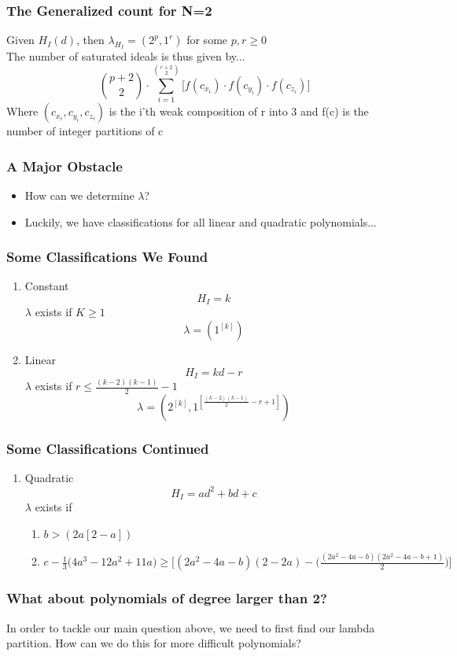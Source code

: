 \documentclass{beamer}
\begin{document}
\begin{frame}
	\frametitle{The Generalized count for N=2}
	Given $H_I(d)$, then $\lambda_{H_I} = (2^{p}, 1^{r})$ for some $p,r \geq 0$\\
	The number of saturated ideals is thus given by...
	\[\binom{p+2}{2}\cdot \sum_{i=1}^{\binom{r+2}{2}}\Big[f(c_{x_i})\cdot f(c_{y_i})\cdot f(c_{z_i})\Big]
	\]
	Where $(c_{x_i},c_{y_i}, c_{z_i})$ is the i'th weak composition of r into 3 and f(c) is the number of integer partitions of c
\end{frame}

\begin{frame}
	\frametitle{A Major Obstacle}
	\begin{itemize}
	\item How can we determine $\lambda$? 
	\item Luckily, we have classifications for all linear and quadratic polynomials...
	\end{itemize}
\end{frame}


\begin{frame}
	\frametitle{Some Classifications We Found}
	\begin{enumerate}
				\item Constant
				\[H_I=k \]
				$\lambda$ exists if $K\geq 1$
				\[\lambda = (1^{[k]})\]
				\item Linear
				\[H_I=kd-r\]
				$\lambda$ exists if $r\leq \frac{(k-2)(k-1)}{2}-1$
				\[\lambda = (2^{[k]}, 1^{[\frac{(k-2)(k-1)}{2}-r+1]})\]

	\end{enumerate}
\end{frame}

\begin{frame}
	\frametitle{Some Classifications Continued}
	\begin{enumerate}
				\item Quadratic
				\[H_I=ad^2+bd+c\]
				$\lambda$ exists if
				\begin{enumerate}
					 \item $b > (2a[2-a])$
					\item $c - \frac{1}{3}\big(4a^3-12a^2+11a\big)\geq  \Big[(2a^2-4a-b)(2-2a)-\Big(\frac{(2a^2-4a-b)(2a^2-4a-b+1)}{2}\Big)\Big]$
				\end{enumerate}
	\end{enumerate}
\end{frame}

\begin{frame}
	\frametitle{What about polynomials of degree larger than 2?}
	In order to tackle our main question above, we need to first find our lambda partition. How can we do this for more difficult polynomials? 
\end{frame}
\end{document}
